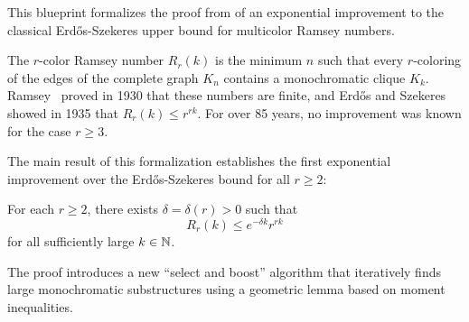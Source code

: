 
This blueprint formalizes the proof from \cite{CGMS} of an exponential improvement to the classical Erdős-Szekeres upper bound for multicolor Ramsey numbers.

The $r$-color Ramsey number $R_r(k)$ is the minimum $n$ such that every $r$-coloring of the edges of the complete graph $K_n$ contains a monochromatic clique $K_k$.
Ramsey~\cite{Ramsey30} proved in 1930 that these numbers are finite, and Erdős and Szekeres~\cite{ESz35} showed in 1935 that $R_r(k) \le r^{rk}$.
For over 85 years, no improvement was known for the case $r \ge 3$.

The main result of this formalization establishes the first exponential improvement over the Erdős-Szekeres bound for all $r \ge 2$:


\begin{theorem}
    \label{thm:Ramsey:multicolour}
    For each $r \ge 2$, there exists $\delta = \delta(r) > 0$ such that
    \begin{equation*}
        R_r(k) \le e^{-\delta k} r^{rk}
    \end{equation*}
    for all sufficiently large $k \in \mathbb{N}$.
\end{theorem}

The proof introduces a new ``select and boost'' algorithm that iteratively finds large monochromatic substructures using a geometric lemma based on moment inequalities.
